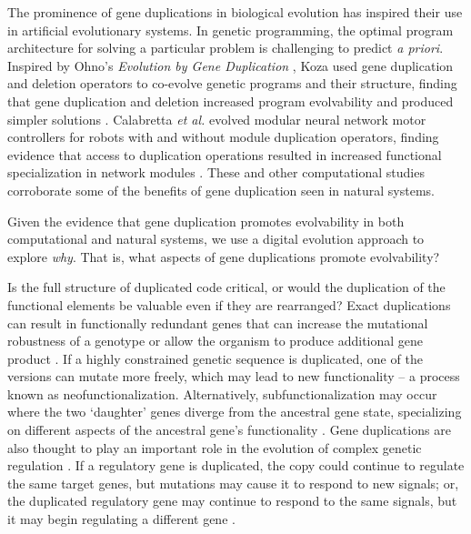 The prominence of gene duplications in biological evolution has inspired their use in artificial evolutionary systems. In genetic programming, the optimal program architecture for solving a particular problem is challenging to predict \textit{a priori}. Inspired by Ohno's \textit{Evolution by Gene Duplication} \citep{ohno1970evolution}, Koza used gene duplication and deletion operators to co-evolve genetic programs and their structure, finding that gene duplication and deletion increased program evolvability and produced simpler solutions \citep{Koza:1995fr}. Calabretta \textit{et al.} evolved modular neural network motor controllers for robots with and without module duplication operators, finding evidence that access to duplication operations resulted in increased functional specialization in network modules \citep{Calabretta:1998vh,Calabretta:2000tl}.
These and other computational studies \citep{Ryan:1998gm,Sawai:1999genetic,Sawai:2000comparative,Schmitt:2005bc} corroborate some of the benefits of gene duplication seen in natural systems.

Given the evidence that gene duplication promotes evolvability in both computational and natural systems, we use a digital evolution approach to explore \textit{why}. That is, what aspects of gene duplications promote evolvability?

Is the full structure of duplicated code critical, or would the duplication of the functional elements be valuable even if they are rearranged? Exact duplications can result in functionally redundant genes that can increase the mutational robustness of a genotype \citep{Crow:2006role} or %
allow the organism to produce
additional gene product %
\citep{Zhang:2003fw}. If a highly constrained genetic sequence is duplicated, one of the versions can mutate more freely, which may lead to new functionality \citep{Zhang:2003fw,Wagner:2003fk} -- a process known as neofunctionalization. Alternatively, subfunctionalization may occur where the two `daughter' genes diverge from the ancestral gene state, specializing on different aspects of the ancestral gene's functionality
\citep{Zhang:2003fw}.
Gene duplications are also thought to play an important role in the evolution of complex genetic regulation \citep{Teichmann:2004cz}. If a regulatory gene is duplicated, the copy could continue to regulate the same target genes, but mutations may cause it to respond to new signals; or, the duplicated regulatory gene may continue to respond to the same signals, but it may begin regulating a different gene \citep{Teichmann:2004cz}.

